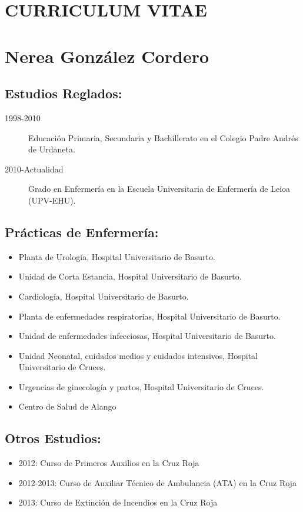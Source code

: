 \documentclass[10pt,a4paper,notitlepage]{article}
\author{Nerea Gonzalez Cordero}
\begin{document}
\section*{CURRICULUM VITAE}
\section*{Nerea González Cordero}
\subsection*{Estudios Reglados:}
\begin{description}
  \item[1998-2010] Educación Primaria, Secundaria y Bachillerato en el Colegio Padre Andrés de Urdaneta.
  \item[2010-Actualidad] Grado en Enfermería en la Escuela Universitaria de Enfermería de Leioa (UPV-EHU).
\end{description}

\subsection*{Prácticas de Enfermería:}
\begin{itemize}
  \item Planta de Urología, Hospital Universitario de Basurto.
  \item Unidad de Corta Estancia, Hospital Universitario de Basurto.
  \item Cardiología, Hospital Universitario de Basurto.
  \item Planta de enfermedades respiratorias, Hospital Universitario de Basurto.
  \item Unidad de enfermedades infecciosas, Hospital Universitario de Basurto.
  \item Unidad Neonatal, cuidados medios y cuidados intensivos, Hospital Universitario de Cruces.
  \item Urgencias de ginecología y partos, Hospital Universitario de Cruces.
  \item Centro de Salud de Alango
\end{itemize}

\subsection*{Otros Estudios:}
\begin{itemize}
  \item 2012: Curso de Primeros Auxilios en la Cruz Roja
  \item 2012-2013: Curso de Auxiliar Técnico de Ambulancia (ATA) en la Cruz Roja
  \item 2013: Curso de Extinción de Incendios en la Cruz Roja
\end{itemize}
\end{document}
